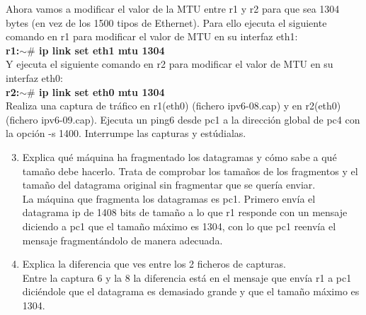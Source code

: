 \documentclass[12pt, a4paper]{report}
\begin{document}
Ahora vamos a modificar el valor de la MTU entre r1 y r2 para que sea 1304 bytes (en vez de
los 1500 tipos de Ethernet). Para ello ejecuta el siguiente comando en r1 para modificar el valor de
MTU en su interfaz eth1:\\

\textbf{r1:$\sim\#$ ip link set eth1 mtu 1304}\\

Y ejecuta el siguiente comando en r2 para modificar el valor de MTU en su interfaz eth0:\\

\textbf{r2:$\sim\#$ ip link set eth0 mtu 1304}\\

Realiza una captura de tráfico en r1(eth0) (fichero ipv6-08.cap) y en r2(eth0) (fichero
ipv6-09.cap). Ejecuta un ping6 desde pc1 a la dirección global de pc4 con la opción -s 1400.
Interrumpe las capturas y estúdialas.\\
\begin{enumerate}
	\setcounter{enumi}{2}
	\item Explica qué máquina ha fragmentado los datagramas y cómo sabe a qué tamaño debe hacerlo.
	Trata de comprobar los tamaños de los fragmentos y el tamaño del datagrama original sin
	fragmentar que se quería enviar.\\
	
	La máquina que fragmenta los datagramas es pc1. Primero envía el datagrama ip de 1408 bits de tamaño a lo que r1 responde con un mensaje diciendo a pc1 que el tamaño máximo es 1304, con lo que pc1 reenvía el mensaje fragmentándolo de manera adecuada.
	\item Explica la diferencia que ves entre los 2 ficheros de capturas.\\
	
	Entre la captura 6 y la 8 la diferencia está en el mensaje que envía r1 a pc1 diciéndole que el datagrama es demasiado grande y que el tamaño máximo es 1304.
\end{enumerate}
\end{document}
